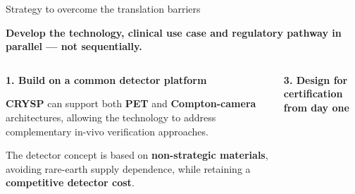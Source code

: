 \documentclass[aspectratio=169,11pt]{beamer}
\begin{document}
\begin{frame}{Strategy to overcome the translation barriers}

\vspace{0.05cm}

\begin{center}
{\small\bfseries
Develop the technology, clinical use case and regulatory pathway in parallel ---
not sequentially.
}
\end{center}

\vspace{0.22cm}

\begin{columns}[T,onlytextwidth]


\colorbox{blue!4}{
\begin{minipage}[t][2.55cm][t]{0.94\linewidth}

{\scriptsize\bfseries\color{PTblue}
1. Build on a common detector platform
}

\vspace{0.10cm}

{\tiny
\textbf{CRYSP} can support both \textbf{PET} and
\textbf{Compton-camera} architectures, allowing the technology
to address complementary in-vivo verification approaches.

\vspace{0.10cm}

The detector concept is based on \textbf{non-strategic materials},
avoiding rare-earth supply dependence, while retaining a
\textbf{competitive detector cost}.
}

\end{minipage}
}

\vspace{0.18cm}

\colorbox{blue!4}{
\begin{minipage}[t][2.55cm][t]{0.94\linewidth}

{\scriptsize\bfseries\color{PTblue}
3. Design for certification from day one
}

\vspace{0.10cm}


\end{minipage}}
\end{columns}
\end{frame}
\end{document}
